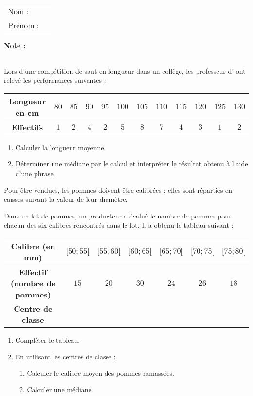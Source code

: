 \documentclass[10pt,french]{book}
\newcommand\competences{
\setcounter{exo}{0}
\begin{tabular}{ll} Nom : \\[5pt] Prénom : \end{tabular}
\hfill
\textbf{Note :}\renewcommand\arraystretch{2.3}
\begin{tabularx}{0.18\linewidth}{|X|}
\hline
\slashbox{\Huge\bfseries\phantom{10}}{\Huge\bfseries 10}\\
\hline
\end{tabularx}\renewcommand\arraystretch{1}\medskip
}
\begin{document}

\competences

\exo Lors d'une compétition de saut en longueur dans un collège, les professeur d' ont relevé les performances suivantes :

\begin{center}
\renewcommand\arraystretch{1.5}
	\begin{tabular}{|*{12}{c|}}
	\hline
		{\bf Longueur en cm} & $80$ & $85$ & $90$ & $95$ & $100$ & $105$ & $110$ & $115$ & $120$ & $125$ & $130$ \\
	\hline
		{\bf Effectifs} & $1$ & $2$ & $4$ & $2$ & $5$ & $8$ & $7$ & $4$ & $3$ & $1$ & $2$ \\
	\hline
	\end{tabular}
\end{center}

\begin{enumerate}
	\item Calculer la longueur moyenne.
	\item Déterminer une médiane par le calcul et interpréter le résultat obtenu à l'aide d'une phrase.
\end{enumerate}\bigskip

\exo Pour être vendues, les pommes doivent être calibrées : elles sont réparties en caisses suivant la valeur de leur diamètre.\par
Dans un lot de pommes, un producteur a évalué le nombre de pommes pour chacun des six calibres rencontrés dans le lot. Il a obtenu le tableau suivant :\medskip

\begin{center}
\renewcommand\arraystretch{1.5}
	\begin{tabular}{|c|c|c|c|c|c|c|}
	\hline
	   {\bf Calibre (en mm)} & $[50 ; 55[$ & $[55;60[$ & $[60;65[$ & $[65;70[$ & $[70;75[$ & $[75;80[$\\
    \hline
        {\bf Effectif (nombre de pommes)} & $15$ & $20$ & $30$ & $24$ & $26$ & $18$\\
    \hline
        {\bf Centre de classe} & & & & & & \\
    \hline
    \end{tabular}
\end{center}
%
\begin{enumerate}
    \item Compléter le tableau.
    \item En utilisant les centres de classe :
        \begin{enumerate}
            \item Calculer le calibre moyen des pommes ramassées.
            \item Calculer une médiane.
        \end{enumerate}
\end{enumerate}
\end{document}
